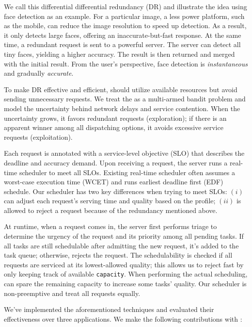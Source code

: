 We call this differential differential redundancy (DR) and illustrate the idea
using face detection as an example. For a particular image, a less power
platform, such as the mobile, can reduce the image resolution to speed up
detection. As a result, it only detects large faces, offering an
inaccurate-but-fast response. At the same time, a redundant request is sent to a
powerful server. The server can detect all tiny faces, yielding a higher
accuracy. The result is then returned and merged with the initial result. From
the user's perspective, face detection is \emph{instantaneous} and gradually
\emph{accurate}.

To make DR effective and efficient, \brt{} should utilize available
resources but avoid sending unnecessary requests. We treat the as a multi-armed
bandit problem and model the uncertainty behind network delays and service
contention. When the uncertainty grows, it favors redundant requests
(exploration); if there is an apparent winner among all dispatching options, it
avoids excessive service requests (exploitation).

 Each request is annotated with a
service-level objective (SLO) that describes the deadline and accuracy
demand. Upon receiving a request, the server runs a real-time scheduler to meet
all SLOs. Existing real-time scheduler often assumes a worst-case execution time
(WCET) and runs earliest deadline first (EDF) schedule. Our scheduler has two
key differences when trying to meet SLOs: $(i)$ \brt{} can adjust each
request's serving time and quality based on the profile; $(ii)$ \brt{} is
allowed to reject a request because of the redundancy mentioned above.

At runtime, when a request comes in, the server first performs triage to
determine the urgency of the request and its priority among all pending
tasks. If all tasks are still schedulable after admitting the new request, it's
added to the task queue; otherwise, \brt{} rejects the request. The
schedulability is checked if all requests are serviced at its lowest-allowed
quality; this allows us to reject fast by only keeping track of available
\texttt{capacity}. When performing the actual scheduling, \brt{} can spare
the remaining capacity to increase some tasks' quality. Our scheduler is
non-preemptive and treat all requests equally.

We've implemented the aforementioned techniques and evaluated their
effectiveness over three applications. We make the following contributions with
\brt{}:

